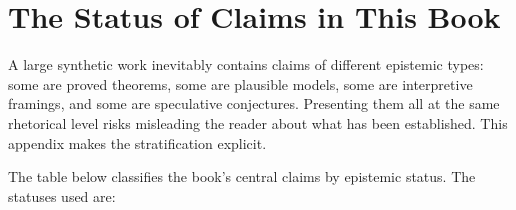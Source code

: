 \documentclass[12pt,twoside,openright]{book}
\begin{document}
%

\chapter{The Status of Claims in This Book}
\label{app:claim-status}

A large synthetic work inevitably contains claims of
different epistemic types: some are proved theorems, some
are plausible models, some are interpretive framings, and
some are speculative conjectures. Presenting them all at
the same rhetorical level risks misleading the reader about
what has been established. This appendix makes the
stratification explicit.

The table below classifies the book's central claims by
epistemic status. The statuses used are:
\end{document}

